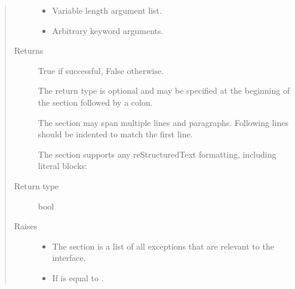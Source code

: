 \documentclass[letterpaper,10pt,english]{sphinxmanual}
\begin{document}
\begin{fulllineitems}
\begin{quote}
\begin{description}
\begin{itemize}
\item {} 
\sphinxAtStartPar
{} \textendash{} Variable length argument list.

\item {} 
\sphinxAtStartPar
{} \textendash{} Arbitrary keyword arguments.

\end{itemize}

\item[{Returns}] \leavevmode
\sphinxAtStartPar

\sphinxAtStartPar
True if successful, False otherwise.

\sphinxAtStartPar
The return type is optional and may be specified at the beginning of
the  section followed by a colon.

\sphinxAtStartPar
The  section may span multiple lines and paragraphs.
Following lines should be indented to match the first line.

\sphinxAtStartPar
The  section supports any reStructuredText formatting,
including literal blocks:

\begin{sphinxVerbatim}[commandchars=\\\{\}]
     
     
\end{sphinxVerbatim}


\item[{Return type}] \leavevmode
\sphinxAtStartPar
bool

\item[{Raises}] \leavevmode\begin{itemize}
\item {} 
\sphinxAtStartPar
{} \textendash{} The  section is a list of all exceptions
    that are relevant to the interface.

\item {} 
\sphinxAtStartPar
{} \textendash{} If  is equal to .

\end{itemize}

\end{description}\end{quote}

\end{fulllineitems}
\end{document}
